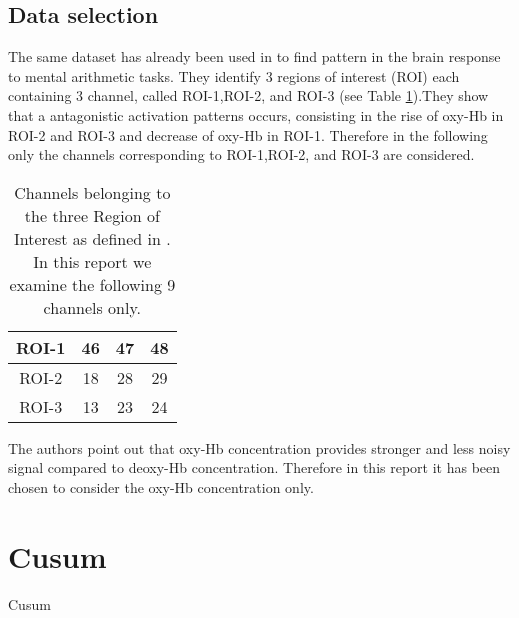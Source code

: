 \documentclass[preprint,12pt]{elsarticle}
\begin{document}
\subsection{Data selection}
The same dataset has already been used in \cite{bauernfeind2011single,pfurtscheller2010focal} to find pattern in the brain response to mental arithmetic tasks. They identify 3 regions of interest (ROI) each containing 3 channel, called ROI-1,ROI-2, and ROI-3 (see Table \ref{Table:ROI}).They show that  a antagonistic activation patterns occurs, consisting in the rise of  oxy-Hb in ROI-2 and ROI-3 and decrease of oxy-Hb in ROI-1. Therefore in the following  only  the channels corresponding to  ROI-1,ROI-2, and ROI-3 are considered.
\begin{table}
\caption{Channels belonging to the three Region of Interest as defined in \cite{bauernfeind2011single}. In this report we examine the following 9 channels only.}
\centering
\begin{tabular}{c|ccc}
	\hline
	ROI-1	&46	&47	&48\\
	\hline
	ROI-2	&18	&28	&29\\		
	\hline
   	ROI-3	&13	&23	&24\\   
   \end{tabular}   
   \label{Table:ROI}
\end{table}
 The authors point out that oxy-Hb concentration provides stronger and less noisy signal compared to  deoxy-Hb concentration. Therefore in this report it has been chosen to consider the oxy-Hb concentration only. 


\section{Cusum}
Cusum 








\end{document}
